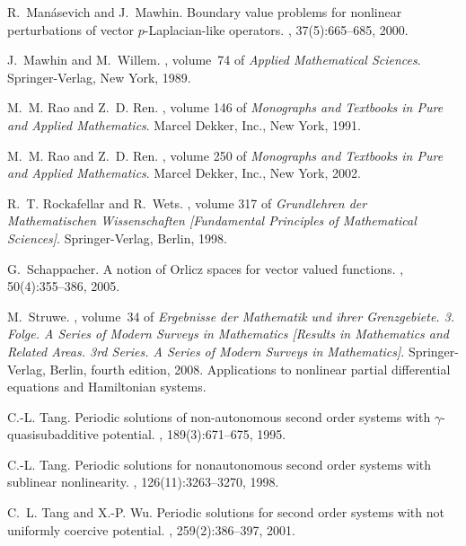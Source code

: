 \documentclass[twoside]{elsarticle}
\theoremstyle{remark}
\begin{document}
\begin{thebibliography}{10}
R.~Man{\'a}sevich and J.~Mawhin.
\newblock Boundary value problems for nonlinear perturbations of vector
  {$p$}-{L}aplacian-like operators.
, 37(5):665--685, 2000.

J.~Mawhin and M.~Willem.
, volume~74 of
  {\em Applied Mathematical Sciences}.
\newblock Springer-Verlag, New York, 1989.

M.~M. Rao and Z.~D. Ren.
, volume 146 of {\em Monographs and
  Textbooks in Pure and Applied Mathematics}.
\newblock Marcel Dekker, Inc., New York, 1991.

M.~M. Rao and Z.~D. Ren.
, volume 250 of {\em Monographs
  and Textbooks in Pure and Applied Mathematics}.
\newblock Marcel Dekker, Inc., New York, 2002.

R.~T. Rockafellar and R.~Wets.
, volume 317 of {\em Grundlehren der
  Mathematischen Wissenschaften [Fundamental Principles of Mathematical
  Sciences]}.
\newblock Springer-Verlag, Berlin, 1998.

G.~Schappacher.
\newblock A notion of {O}rlicz spaces for vector valued functions.
, 50(4):355--386, 2005.

M.~Struwe.
, volume~34 of {\em Ergebnisse der
  Mathematik und ihrer Grenzgebiete. 3. Folge. A Series of Modern Surveys in
  Mathematics [Results in Mathematics and Related Areas. 3rd Series. A Series
  of Modern Surveys in Mathematics]}.
\newblock Springer-Verlag, Berlin, fourth edition, 2008.
\newblock Applications to nonlinear partial differential equations and
  Hamiltonian systems.

C.-L. Tang.
\newblock Periodic solutions of non-autonomous second order systems with
  {$\gamma$}-quasisubadditive potential.
, 189(3):671--675, 1995.

C.-L. Tang.
\newblock Periodic solutions for nonautonomous second order systems with
  sublinear nonlinearity.
, 126(11):3263--3270, 1998.

C.~L. Tang and X.-P. Wu.
\newblock Periodic solutions for second order systems with not uniformly
  coercive potential.
, 259(2):386--397, 2001.


\end{thebibliography}
\end{document}
